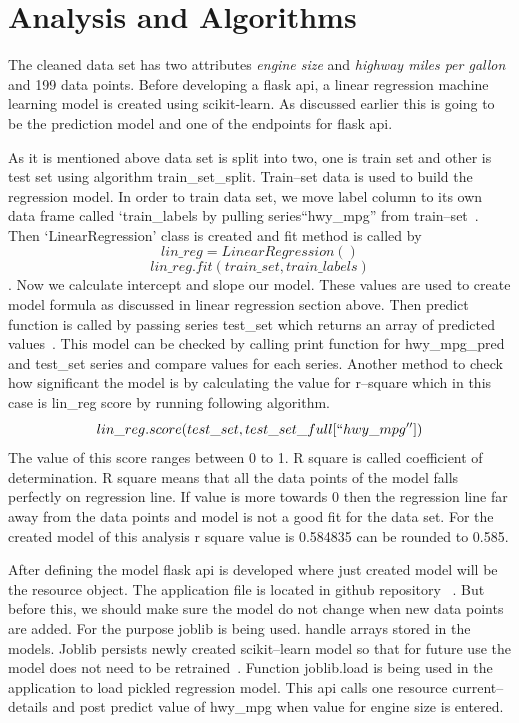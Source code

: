 \section{Analysis and Algorithms}
  The cleaned data set has two attributes \textit{engine size} and
  \textit{highway miles per gallon} and 199 data points. Before developing
   a flask api, a linear regression machine learning model is created using
   scikit-learn. As discussed earlier this is going to be the prediction model
   and one of the endpoints for flask api.

   As it is mentioned above data set is split into two, one is train
   set and other is test set using algorithm train\_set\_split. 
   Train--set data is used to build the regression
   model. In order to train data set, we move label column to its own data frame
   called `train\_labels by pulling  series``hwy\_mpg'' from 
   train--set~\cite{hid-sp18-415-regression}. Then `LinearRegression' 
   class is created and fit 
   method is called by \[lin\_reg = LinearRegression()\] 
   \[lin\_reg.fit(train\_set, train\_labels)\]. Now we calculate intercept and
  slope our model. These values are used to create model formula
  as discussed in linear regression section above. Then predict function is
  called  by passing series test\_set which returns an array of predicted 
  values~\cite{hid-sp-18-415-regression}. This model can be checked by calling
  print function for hwy\_mpg\_pred
  and test\_set series and compare values for each series. Another method to
  check how significant the model is by calculating the value for r--square 
  which in this case is lin\_reg score by running following algorithm.  
  \[lin\_reg.score(test\_set, test\_set\_full[``hwy\_mpg''])\]
  The value of this score ranges between 0 to 1. R square is called coefficient
  of determination. R square means that all the data points of the model falls
  perfectly on regression line. If value is more towards 0 then the regression 
  line far away from the data points and model is not a good fit for the data
  set. For the created model of this analysis r square value is 
  0.584835 can be rounded to 0.585.
  
  After defining the model flask api is developed where just created model will 
  be the resource object. The application file is located in github repository
  ~\cite{hid-sp-18-415-regresssionapi}. But before this,
   we should make sure the model do not 
  change when new data points are added. For the purpose joblib is being used.
  handle arrays stored in the models. Joblib persists newly created
  scikit--learn model so that for future use the model does not need to be
  retrained~\cite{hid-sp-18-415-joblib}. Function joblib.load is being used in
  the application to load pickled regression model. This api calls one resource 
  current--details  and post predict value of hwy\_mpg when value for engine
  size is entered. 
   
